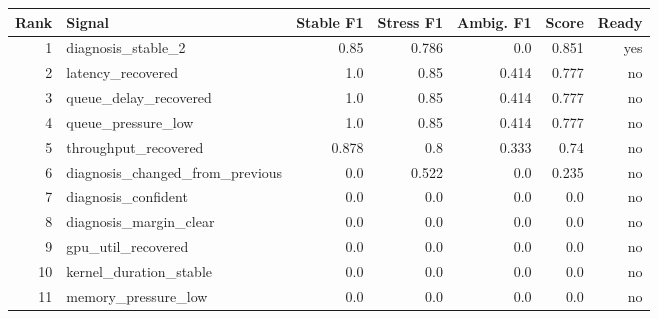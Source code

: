 \begin{tabular}{rlrrrrr}
\hline
Rank & Signal & Stable F1 & Stress F1 & Ambig. F1 & Score & Ready \\
\hline
1 & diagnosis_stable_2 & 0.85 & 0.786 & 0.0 & 0.851 & yes \\
2 & latency_recovered & 1.0 & 0.85 & 0.414 & 0.777 & no \\
3 & queue_delay_recovered & 1.0 & 0.85 & 0.414 & 0.777 & no \\
4 & queue_pressure_low & 1.0 & 0.85 & 0.414 & 0.777 & no \\
5 & throughput_recovered & 0.878 & 0.8 & 0.333 & 0.74 & no \\
6 & diagnosis_changed_from_previous & 0.0 & 0.522 & 0.0 & 0.235 & no \\
7 & diagnosis_confident & 0.0 & 0.0 & 0.0 & 0.0 & no \\
8 & diagnosis_margin_clear & 0.0 & 0.0 & 0.0 & 0.0 & no \\
9 & gpu_util_recovered & 0.0 & 0.0 & 0.0 & 0.0 & no \\
10 & kernel_duration_stable & 0.0 & 0.0 & 0.0 & 0.0 & no \\
11 & memory_pressure_low & 0.0 & 0.0 & 0.0 & 0.0 & no \\
\hline
\end{tabular}
